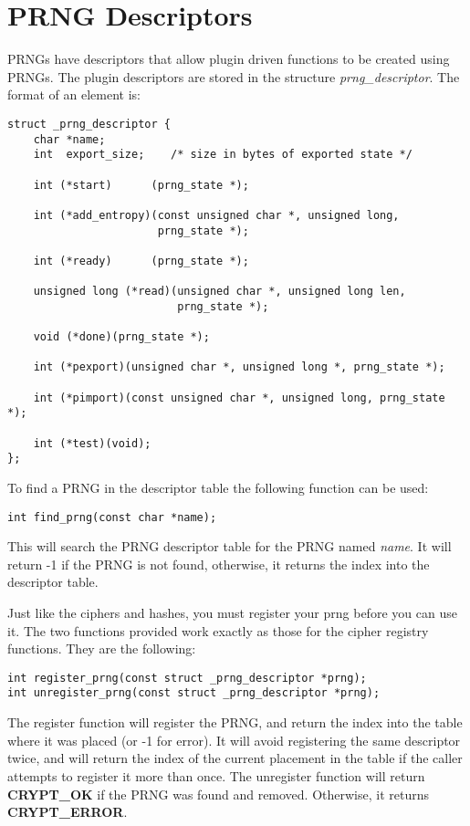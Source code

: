 \documentclass[synpaper]{book}
\newcommand{\mysection}[1]    %
	{                   %
	\section{#1}
   \markboth{\textsf{www.libtom.net}}{\thesection ~ {#1}}
	}
\begin{document}
\mysection{PRNG Descriptors}
PRNGs have descriptors that allow plugin driven functions to be created using PRNGs. The plugin descriptors are stored in the structure \textit{prng\_descriptor}.  The
format of an element is:
\begin{verbatim}
struct _prng_descriptor {
    char *name;
    int  export_size;    /* size in bytes of exported state */

    int (*start)      (prng_state *);

    int (*add_entropy)(const unsigned char *, unsigned long,
                       prng_state *);

    int (*ready)      (prng_state *);

    unsigned long (*read)(unsigned char *, unsigned long len,
                          prng_state *);

    void (*done)(prng_state *);

    int (*pexport)(unsigned char *, unsigned long *, prng_state *);

    int (*pimport)(const unsigned char *, unsigned long, prng_state *);

    int (*test)(void);
};
\end{verbatim}

To find a PRNG in the descriptor table the following function can be used:
\begin{verbatim}
int find_prng(const char *name);
\end{verbatim}
This will search the PRNG descriptor table for the PRNG named \textit{name}.  It will return -1 if the PRNG is not found, otherwise, it returns
the index into the descriptor table.

Just like the ciphers and hashes, you must register your prng before you can use it.  The two functions provided work exactly as those for the cipher registry functions.
They are the following:
 
\begin{verbatim}
int register_prng(const struct _prng_descriptor *prng);
int unregister_prng(const struct _prng_descriptor *prng);
\end{verbatim}

The register function will register the PRNG, and return the index into the table where it was placed (or -1 for error).  It will avoid registering the same
descriptor twice, and will return the index of the current placement in the table if the caller attempts to register it more than once.  The unregister function
will return \textbf{CRYPT\_OK} if the PRNG was found and removed.  Otherwise, it returns \textbf{CRYPT\_ERROR}.
\end{document}
